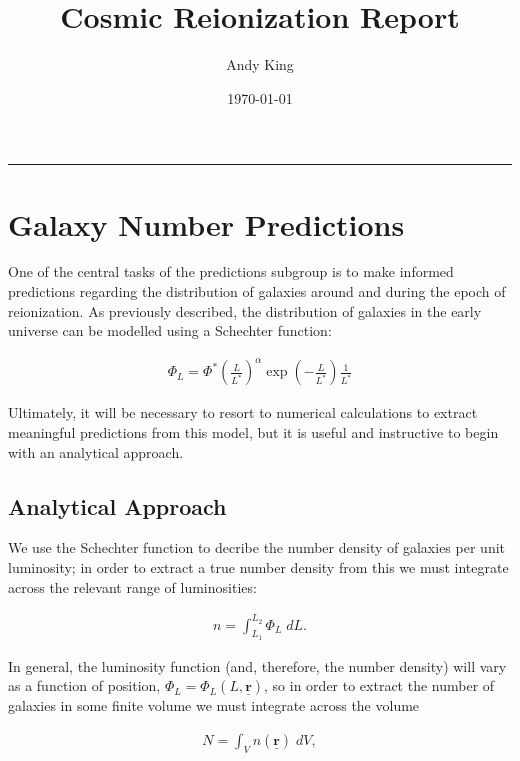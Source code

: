 \documentclass[pdf,color]{UoBnote}
\author{Andy King}
\title{Cosmic Reionization Report}
\date{\today}
\begin{document}
\maketitle
\tableofcontents
\vspace{1cm}\hrule \vspace{1cm}


\section{ Galaxy Number Predictions}	%

One of the central tasks of the predictions subgroup is to make informed predictions regarding the distribution of galaxies around and during the epoch of reionization. As previously described, the distribution of galaxies in the early universe can be modelled using a Schechter function:

\begin{align}	
			\Phi_L = \Phi^*  \left(\frac{L}{L^*}\right)^\alpha \exp{\left( -\frac{L}{L^*} \right)} \frac{1}{L^*}
\end{align}

Ultimately, it will be necessary to resort to numerical calculations to extract meaningful predictions from this model, but it is useful and instructive to begin with an analytical approach.

\subsection{Analytical Approach}	%

We use the Schechter function to decribe the number density of galaxies per unit luminosity; in order to extract a true number density from this we must integrate across the relevant range of luminosities:

\begin{align}	
			n = \int_{L_1}^{L_2}  { \Phi_L \; dL } .		
\end{align}

In general, the luminosity function (and, therefore, the number density) will vary as a function of position, $\Phi_L = \Phi_L (L,\underline{\mathbf{r}})$, so in order to extract the number of galaxies in some finite volume we must integrate across the volume

\begin{align}	
			N = \int_V { n(\underline{\mathbf{r}}) \; dV } ,		
\end{align}
\end{document}
